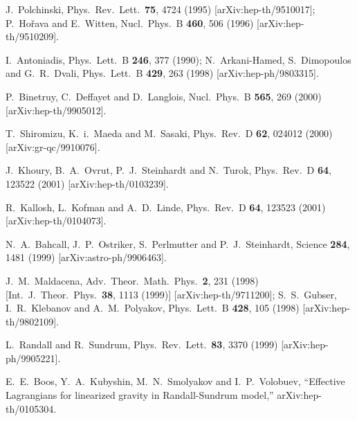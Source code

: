 \documentclass[a4paper,preprint,nofootinbib,
                 showpacs,preprintnumbers,amsmath,amssymb]{revtex4}
\begin{document}
 
   \begin{thebibliography}{99} 
J.~Polchinski, 
Phys.\ Rev.\ Lett.\  {\bf 75}, 4724 (1995) 
[arXiv:hep-th/9510017]; 
P.~Ho\v{r}ava and E.~Witten, 
Nucl.\ Phys.\ B {\bf 460}, 506 (1996) 
[arXiv:hep-th/9510209]. 
 
I.~Antoniadis, 
Phys.\ Lett.\ B {\bf 246}, 377 (1990); 
N.~Arkani-Hamed, S.~Dimopoulos and G.~R.~Dvali, 
Phys.\ Lett.\ B {\bf 429}, 263 (1998) 
[arXiv:hep-ph/9803315]. 
 
P.~Binetruy, C.~Deffayet and D.~Langlois, 
Nucl.\ Phys.\ B {\bf 565}, 269 (2000) 
[arXiv:hep-th/9905012]. 
 
T.~Shiromizu, K.~i.~Maeda and M.~Sasaki, 
Phys.\ Rev.\ D {\bf 62}, 024012 (2000) [arXiv:gr-qc/9910076]. 
 
J.~Khoury, B.~A.~Ovrut, P.~J.~Steinhardt and N.~Turok, 
Phys.\ Rev.\ D {\bf 64}, 123522 (2001) 
[arXiv:hep-th/0103239]. 
 
R.~Kallosh, L.~Kofman and A.~D.~Linde, 
Phys.\ Rev.\ D {\bf 64}, 123523 (2001) 
[arXiv:hep-th/0104073]. 
 
N.~A.~Bahcall, J.~P.~Ostriker, S.~Perlmutter and P.~J.~Steinhardt, 
Science {\bf 284}, 1481 (1999) 
[arXiv:astro-ph/9906463]. 
 
J.~M.~Maldacena, 
Adv.\ Theor.\ Math.\ Phys.\  {\bf 2}, 231 (1998) 
[Int.\ J.\ Theor.\ Phys.\  {\bf 38}, 1113 (1999)] 
[arXiv:hep-th/9711200]; 
S.~S.~Gubser, I.~R.~Klebanov and A.~M.~Polyakov, 
Phys.\ Lett.\ B {\bf 428}, 105 (1998) 
[arXiv:hep-th/9802109]. 
 
L.~Randall and R.~Sundrum, 
Phys.\ Rev.\ Lett.\  {\bf 83}, 3370 (1999) 
[arXiv:hep-ph/9905221]. 
 
E.~E.~Boos, Y.~A.~Kubyshin, M.~N.~Smolyakov and I.~P.~Volobuev, 
``Effective Lagrangians for linearized gravity in Randall-Sundrum model,'' 
arXiv:hep-th/0105304. 
 

\end{thebibliography}
\end{document}
